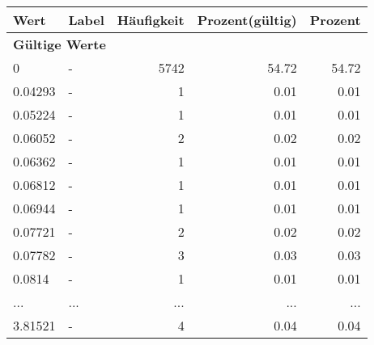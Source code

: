      \begin{longtable}{lXrrr}
     \toprule
     \textbf{Wert} & \textbf{Label} & \textbf{Häufigkeit} & \textbf{Prozent(gültig)} & \textbf{Prozent} \\
     \endhead
     \midrule
     \multicolumn{5}{l}{\textbf{Gültige Werte}}\\
        0 & \multicolumn{1}{X}{-} & %
          \num{5742} &
          \num[round-mode=places,round-precision=2]{54,72} &
          \num[round-mode=places,round-precision=2]{54,72} \\
        0.04293 & \multicolumn{1}{X}{-} & %
          \num{1} &
          \num[round-mode=places,round-precision=2]{0,01} &
          \num[round-mode=places,round-precision=2]{0,01} \\
        0.05224 & \multicolumn{1}{X}{-} & %
          \num{1} &
          \num[round-mode=places,round-precision=2]{0,01} &
          \num[round-mode=places,round-precision=2]{0,01} \\
        0.06052 & \multicolumn{1}{X}{-} & %
          \num{2} &
          \num[round-mode=places,round-precision=2]{0,02} &
          \num[round-mode=places,round-precision=2]{0,02} \\
        0.06362 & \multicolumn{1}{X}{-} & %
          \num{1} &
          \num[round-mode=places,round-precision=2]{0,01} &
          \num[round-mode=places,round-precision=2]{0,01} \\
        0.06812 & \multicolumn{1}{X}{-} & %
          \num{1} &
          \num[round-mode=places,round-precision=2]{0,01} &
          \num[round-mode=places,round-precision=2]{0,01} \\
        0.06944 & \multicolumn{1}{X}{-} & %
          \num{1} &
          \num[round-mode=places,round-precision=2]{0,01} &
          \num[round-mode=places,round-precision=2]{0,01} \\
        0.07721 & \multicolumn{1}{X}{-} & %
          \num{2} &
          \num[round-mode=places,round-precision=2]{0,02} &
          \num[round-mode=places,round-precision=2]{0,02} \\
        0.07782 & \multicolumn{1}{X}{-} & %
          \num{3} &
          \num[round-mode=places,round-precision=2]{0,03} &
          \num[round-mode=places,round-precision=2]{0,03} \\
        0.0814 & \multicolumn{1}{X}{-} & %
          \num{1} &
          \num[round-mode=places,round-precision=2]{0,01} &
          \num[round-mode=places,round-precision=2]{0,01} \\
       ... & ... & ... & ... & ... \\
        3.81521 & \multicolumn{1}{X}{-} & %
          \num{4} &
          \num[round-mode=places,round-precision=2]{0,04} &
          \num[round-mode=places,round-precision=2]{0,04} \\


\end{longtable}
